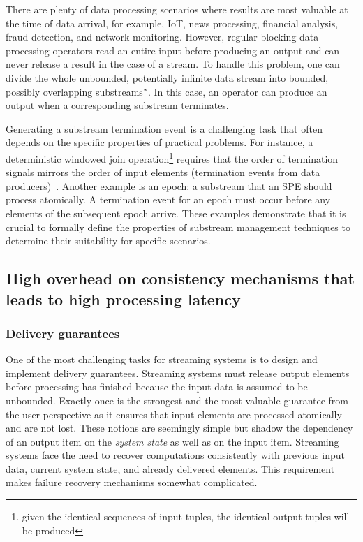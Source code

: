There are plenty of data processing scenarios where results are most valuable at the time of data arrival, for example, IoT, news processing, financial analysis, fraud detection, and network monitoring. However, regular blocking data processing operators read an entire input before producing an output and can never release a result in the case of a stream. To handle this problem, one can divide the whole unbounded, potentially infinite data stream into bounded, possibly overlapping substreams˜\cite{tucker2003exploiting}. In this case, an operator can produce an output when a corresponding substream terminates.

Generating a substream termination event is a challenging task that often depends on the specific properties of practical problems. For instance, a deterministic windowed join operation\footnote{given the identical sequences of input tuples, the identical output tuples will be produced} requires that the order of termination signals mirrors the order of input elements (termination events from data producers)~\cite{najdataei2019stretch, gulisano2016scalejoin}. Another example is an epoch: a substream that an SPE should process atomically. A termination event for an epoch must occur before any elements of the subsequent epoch arrive. These examples demonstrate that it is crucial to formally define the properties of substream management techniques to determine their suitability for specific scenarios.

\subsection{High overhead on consistency mechanisms that leads to high processing latency}

\subsubsection{Delivery guarantees}

One of the most challenging tasks for streaming systems is to design and implement delivery guarantees. 
Streaming systems must release output elements before processing has finished because the input data is assumed to be unbounded. Exactly-once is the strongest and the most valuable guarantee from the user perspective as it ensures that input elements are processed atomically and are not lost. These notions are seemingly simple but shadow the dependency of an output item on the {\em system state} as well as on the input item. 
Streaming systems face the need to recover computations consistently with previous input data, current system state, and already delivered elements.
This requirement makes failure recovery mechanisms somewhat complicated. 


